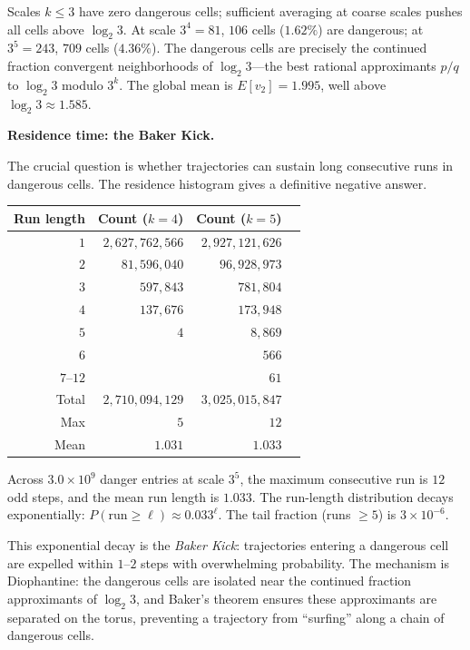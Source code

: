 \documentclass[manuscript]{aomart}
\theoremstyle{plain}
\theoremstyle{definition}
\theoremstyle{remark}
\numberwithin{equation}{section}
\begin{document}
Scales $k \le 3$ have zero dangerous cells; sufficient averaging at
coarse scales pushes all cells above $\log_2 3$.  At scale $3^4 = 81$,
$106$ cells ($1.62\%$) are dangerous; at $3^5 = 243$, $709$ cells
($4.36\%$).  The dangerous cells are precisely the continued fraction
convergent neighborhoods of $\log_2 3$---the best rational
approximants $p/q$ to $\log_2 3$ modulo $3^k$.  The global mean is
$E[v_2] = 1.995$, well above $\log_2 3 \approx 1.585$.

\medskip\noindent
\textbf{Residence time: the Baker Kick.}

The crucial question is whether trajectories can sustain long
consecutive runs in dangerous cells.  The residence histogram gives a
definitive negative answer.

\begin{center}
\renewcommand{\arraystretch}{1.3}
\begin{tabular}{rrrl}
  \toprule
  \textbf{Run length} & \textbf{Count ($k{=}4$)}
  & \textbf{Count ($k{=}5$)} & \\
  \midrule
  $1$ & $2{,}627{,}762{,}566$ & $2{,}927{,}121{,}626$ & \\
  $2$ & $81{,}596{,}040$ & $96{,}928{,}973$ & \\
  $3$ & $597{,}843$ & $781{,}804$ & \\
  $4$ & $137{,}676$ & $173{,}948$ & \\
  $5$ & $4$ & $8{,}869$ & \\
  $6$ &  & $566$ & \\
  $7$--$12$ &  & $61$ & \\
  \bottomrule
  Total & $2{,}710{,}094{,}129$ & $3{,}025{,}015{,}847$ & \\
  Max & $5$ & $12$ & \\
  Mean & $1.031$ & $1.033$ & \\
\end{tabular}
\end{center}

Across $3.0 \times 10^9$ danger entries at scale $3^5$, the maximum
consecutive run is $12$ odd steps, and the mean run length is $1.033$.
The run-length distribution decays exponentially:
$P(\text{run} \ge \ell) \approx 0.033^\ell$.  The tail fraction
(runs $\ge 5$) is $3 \times 10^{-6}$.

This exponential decay is the \emph{Baker Kick}: trajectories entering
a dangerous cell are expelled within $1$--$2$ steps with overwhelming
probability.  The mechanism is Diophantine: the dangerous cells are
isolated near the continued fraction approximants of $\log_2 3$, and
Baker's theorem ensures these approximants are separated on the torus,
preventing a trajectory from ``surfing'' along a chain of dangerous
cells.
\end{document}

